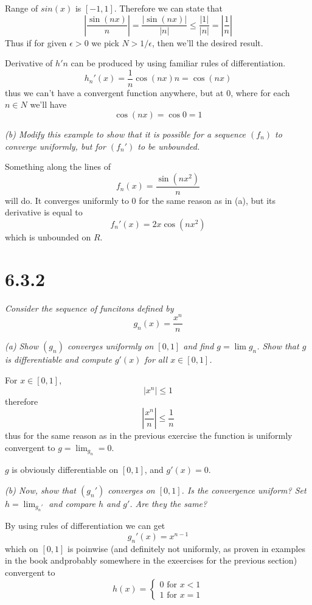 \documentclass[11pt,oneside,titlepage]{book}
\begin{document}
Range of $sin(x)$ is $[-1, 1]$. Therefore we can state that
$$\left|\frac{\sin{(nx)}}{n}\right| = \frac{|\sin{(nx)}|}{|n|}
\leq \frac{|1|}{|n|} = \left|\frac{1}{n}\right|$$
Thus if for given $\epsilon > 0$ we pick $N >  1/\epsilon$, then we'll
the desired result.

Derivative of $h'n$ can be produced by using familiar rules of differentiation.
$$h_n'(x) = \frac{1}{n}\cos{(nx)}n = \cos{(nx)}$$
thus we can't have a convergent function anywhere, but at $0$, where
for each $n \in N$ we'll have
$$\cos{(nx)} = \cos{0} = 1$$

\textit{(b) Modify this example to show that it is possible for a sequence
  $(f_n)$ to converge uniformly, but for $(f_n')$ to be unbounded.}

Something along the lines of
$$f_n(x) = \frac{\sin{(n x^2)}}{n}$$
will do. It converges uniformly to $0$ for the same reason as in (a), but
its derivative is equal to
$$f_n'(x) = 2x \cos{(n x^2)}$$
which is unbounded on $R$.

\section*{6.3.2}
\textit{Consider the sequence of funcitons defined by }
$$g_n(x) = \frac{x^n}{n}$$

\textit{(a) Show $(g_n)$ converges uniformly on $[0, 1]$ and find
  $g = \lim{g_n}$. Show that $g$ is differentiable and compute $g'(x)$
  for all $x \in [0, 1]$.}

For $x \in [0, 1]$,
$$|x^n| \leq 1$$
therefore
$$\left|\frac{x^n}{n}\right| \leq \frac{1}{n}$$
thus for the same reason as in the previous exercise the function is
uniformly convergent to $g = \lim_{g_n} = 0$.

$g$ is obviously differentiable on $[0, 1]$, and $g'(x) = 0$.

\textit{(b) Now, show that $(g_n')$ converges on $[0, 1]$. Is the convergence
uniform? Set $h = \lim_{g_n'}$ and compare $h$ and $g'$. Are they the same?}

By using rules of differentiation we can get
$$g_n'(x) = x^{n - 1}$$
which on $[0, 1]$ is poinwise (and definitely not uniformly, as proven in
examples in the book andprobably somewhere in the exeercises for the previous
section) convergent to
$$h(x) =
\begin{cases}
  0 \text{ for } x < 1 \\
  1 \text{ for } x = 1
\end{cases}
$$
\end{document}
